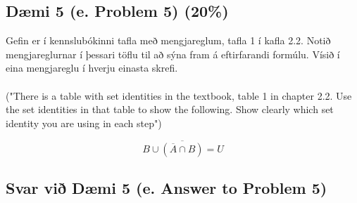 \subsection*{Dæmi 5 (e. Problem 5) (20\%) \label{section:daemi5}}
Gefin er í kennslubókinni tafla með mengjareglum, tafla 1 í kafla 2.2. Notið mengjareglurnar í þessari töflu til að sýna fram á eftirfarandi formúlu. Vísið í eina mengjareglu í hverju einasta skrefi.
\\ \\
("There is a table with set identities in the textbook, table 1 in chapter 2.2. Use the set identities in that table to show the following. Show clearly which set identity you are using in each step")

$$B \cup \overline{(\overline{A} \cap B)} = U $$

\subsection*{Svar við Dæmi 5 (e. Answer to Problem 5)}

\newcommand{\makeAnswerBoxProblemFive}{
  \noindent
  \begin{tcolorbox}[colframe=black, colback=white, boxrule=0.5pt, arc=0pt, outer arc=0pt, height=\dimexpr\textheight-\ht\strutbox-14\baselineskip\relax]

    
  \end{tcolorbox}
}

\makeAnswerBoxProblemFive